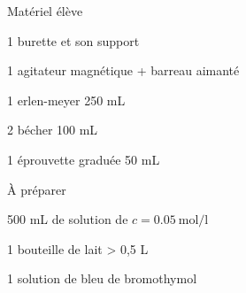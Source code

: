 
\begin{boiteMateriel}{Matériel élève}
  \effectifTerminaleStss

  \begin{listePoints}
    \item 1 burette et son support
    \item 1 agitateur magnétique + barreau aimanté
    \item 1 erlen-meyer 250 mL
    \item 2 bécher 100 mL
    \item 1 éprouvette graduée 50 mL
  \end{listePoints}
\end{boiteMateriel}

\begin{boiteMateriel}{À préparer}
  \begin{listePoints}
    \item 500 mL de solution de  $c = \qty{0,05}{\mol\per\litre}$
    \item 1 bouteille de lait > 0,5 L
    \item 1 solution de bleu de bromothymol
  \end{listePoints}
\end{boiteMateriel}
